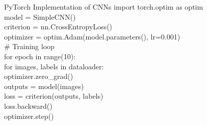 \begin{frame}[allowframebreaks]{PyTorch Implementation of CNNs}
\framebreak
    \ttfamily\footnotesize{
    import torch.optim as optim \\

    model = SimpleCNN() \\
    criterion = nn.CrossEntropyLoss() \\
    optimizer = optim.Adam(model.parameters(), lr=0.001) \\

    \# Training loop \\
    for epoch in range(10): \\
    \hspace{1em}    for images, labels in dataloader: \\
    \hspace{2em}        optimizer.zero\_grad() \\
    \hspace{2em}        outputs = model(images) \\
    \hspace{2em}        loss = criterion(outputs, labels) \\
    \hspace{2em}        loss.backward() \\
    \hspace{2em}        optimizer.step()
    }
\end{frame}